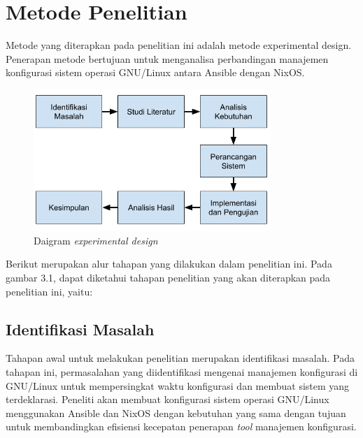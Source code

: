 \documentclass[10pt,]{report}
\begin{document}
\section{Metode Penelitian}
\begin{adjustwidth}{20pt}{}
	\vspace{-3mm}
	\hspace\parindent
	Metode yang diterapkan pada penelitian ini adalah metode experimental design.
	Penerapan metode bertujuan untuk menganalisa perbandingan manajemen
	konfigurasi sistem operasi GNU/Linux antara Ansible dengan NixOS.

	\begin{figure}[h]
		\centering
		\includegraphics[width=0.8\textwidth]{images/metpen.png}
		\caption{Daigram \textit{experimental design}}
	\end{figure}

\end{adjustwidth}
\begin{adjustwidth}{20pt}{}
	\hspace\parindent
	Berikut merupakan alur tahapan yang dilakukan dalam penelitian ini.
	Pada gambar 3.1, dapat diketahui tahapan penelitian yang akan diterapkan
	pada penelitian ini, yaitu:
\end{adjustwidth}
\begin{adjustwidth}{20pt}{}
	\subsection{Identifikasi Masalah}
	\vspace{-3mm}
	\begin{adjustwidth}{20pt}{}
		Tahapan awal untuk melakukan penelitian merupakan identifikasi masalah. Pada
		tahapan ini, permasalahan yang diidentifikasi mengenai manajemen konfigurasi
		di GNU/Linux untuk mempersingkat waktu konfigurasi dan membuat sistem yang
		terdeklarasi. Peneliti akan membuat konfigurasi sistem operasi GNU/Linux
		menggunakan Ansible dan NixOS dengan kebutuhan yang sama dengan tujuan untuk
		membandingkan efisiensi kecepatan penerapan \textit{tool} manajemen konfigurasi.
	\end{adjustwidth}
\end{adjustwidth}
\end{document}
